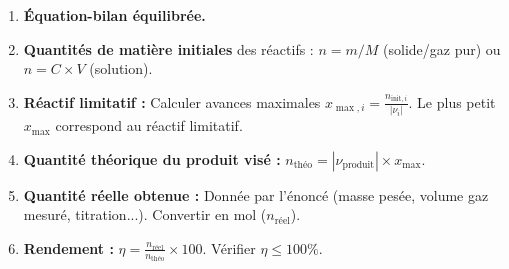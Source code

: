 \documentclass[11pt]{article}
\begin{document}
\begin{methode}
\begin{enumerate}
    \item \textbf{Équation-bilan équilibrée.}
    \item \textbf{Quantités de matière initiales} des réactifs : $n = m/M$ (solide/gaz pur) ou $n = C \times V$ (solution).
    \item \textbf{Réactif limitatif :} Calculer avances maximales $x_{\max,i} = \frac{n_{\text{init},i}}{|\nu_i|}$. Le plus petit $x_{\max}$ correspond au réactif limitatif.
    \item \textbf{Quantité théorique du produit visé :} $n_{\text{théo}} = |\nu_{\text{produit}}| \times x_{\max}$.
    \item \textbf{Quantité réelle obtenue :} Donnée par l'énoncé (masse pesée, volume gaz mesuré, titration...). Convertir en mol ($n_{\text{réel}}$).
    \item \textbf{Rendement :} $\eta = \frac{n_{\text{réel}}}{n_{\text{théo}}} \times 100$. Vérifier $\eta \le 100\%$.
\end{enumerate}
\end{methode}
\end{document}
